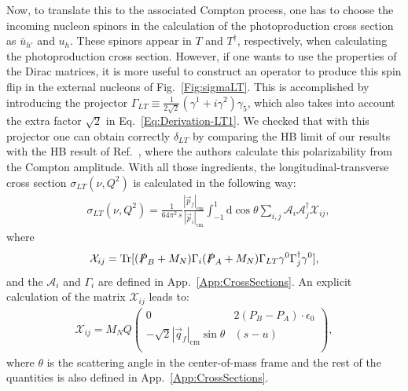 \documentclass[twocolumn,prc,showpacs,nofootinbib,preprintnumbers,amsmath,amssymb,superscriptaddress]{revtex4-1}
\def\dd{\mathrm{d}}
\begin{document}
Now, to translate this to the associated Compton process, one has to choose the incoming nucleon spinors in the calculation of the photoproduction cross section as $\bar{u}_{h'}$ and $u_{h}$. 
These spinors appear in $T$ and $T^\dagger$, respectively, when calculating the photoproduction cross section. However, if one wants to use the properties of the Dirac matrices, it is more useful to construct an operator to produce this spin flip in the external nucleons of Fig.~\ref{Fig:sigmaLT}. 
This is accomplished by introducing the projector $\Gamma_{LT}\equiv \frac{1}{2\sqrt{2}}(\gamma^1+ i \gamma^2)\gamma_5$, which also takes into account the extra factor $\sqrt{2}$ in Eq.~\eqref{Eq:Derivation-LT1}. 
We checked that with this projector one can obtain correctly $\delta_{LT}$ by comparing the HB limit of our results with the HB result of Ref.~\cite{Kao:2002cp}, where the authors calculate this polarizability from the Compton amplitude.
With all those ingredients, the longitudinal-transverse cross section $\sigma_{LT}(\nu,Q^2)$ is calculated in the following way:
\begin{align}\label{Eq:Derivation-LT2}
&\sigma_{LT}(\nu,Q^2)=\frac{1}{64\pi^2\,s}\frac{|\vec{p}_f|_\mathrm{cm}}{|\vec{p}_i|_\mathrm{cm}} \int_{-1}^{1}\!\!\!\! \dd\!\cos\!\theta \sum_{i,j} \mathcal{A}_i  \mathcal{A}^\dagger_j \mathcal{X}_{ij}, 
\end{align}
where 
\begin{align}
\mathcal{X}_{ij}=\text{Tr}[(\slashed{P}_B+M_N)\Gamma_i(\slashed{P}_A+M_N)\Gamma_{LT}\gamma^0\Gamma_j^\dagger\gamma^0 ],
\end{align}
and the $\mathcal{A}_i$ and $\Gamma_i$ are defined in App.~\ref{App:CrossSections}. An explicit calculation of the matrix $\mathcal{X}_{ij}$ leads to:
\begin{align}
 \mathcal{X}_{ij}=M_N Q \left(\begin{array}{cc}
  0   & 2  (P_B-P_A)\cdot \epsilon_0 \\
 -\sqrt{2} |\vec{q}_f|_\mathrm{cm} \sin\theta &  (s-u) \\
 \end{array}
 \right),
 \end{align}
where $\theta$ is the scattering angle in the center-of-mass frame and the rest of the quantities is also defined in App.~\ref{App:CrossSections}.
\end{document}
